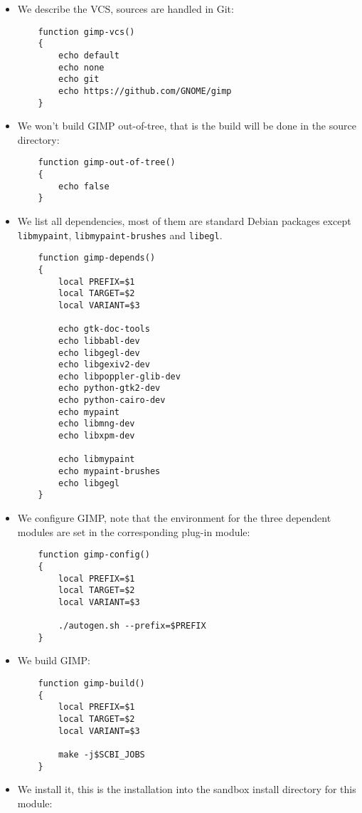 \documentclass[a4paper,12pt,twoside]{article}
\newcommand{\code}[1]{\texttt{#1}}
\begin{document}
\begin{itemize}
	\item We describe the VCS, sources are handled in Git:

	\begin{lstlisting}
	function gimp-vcs()
	{
		echo default
		echo none
		echo git
		echo https://github.com/GNOME/gimp
	}
	\end{lstlisting}

	\item We won't build GIMP out-of-tree, that is the build will be done in the source directory:

	\begin{lstlisting}
	function gimp-out-of-tree()
	{
		echo false
	}
	\end{lstlisting}

	\item We list all dependencies, most of them are standard Debian packages except \code{libmypaint}, \code{libmypaint-brushes} and \code{libegl}.

	\begin{lstlisting}
	function gimp-depends()
	{
		local PREFIX=$1
		local TARGET=$2
		local VARIANT=$3

		echo gtk-doc-tools
		echo libbabl-dev
		echo libgegl-dev
		echo libgexiv2-dev
		echo libpoppler-glib-dev
		echo python-gtk2-dev
		echo python-cairo-dev
		echo mypaint
		echo libmng-dev
		echo libxpm-dev

		echo libmypaint
		echo mypaint-brushes
		echo libgegl
	}
	\end{lstlisting}

	\item We configure GIMP, note that the environment for the three dependent modules are set in the corresponding plug-in module:

	\begin{lstlisting}
	function gimp-config()
	{
		local PREFIX=$1
		local TARGET=$2
		local VARIANT=$3

		./autogen.sh --prefix=$PREFIX
	}
	\end{lstlisting}

	\item We build GIMP:

	\begin{lstlisting}
	function gimp-build()
	{
		local PREFIX=$1
		local TARGET=$2
		local VARIANT=$3

		make -j$SCBI_JOBS
	}
	\end{lstlisting}

	\item We install it, this is the installation into the sandbox install directory for this module:


\end{itemize}
\end{document}
